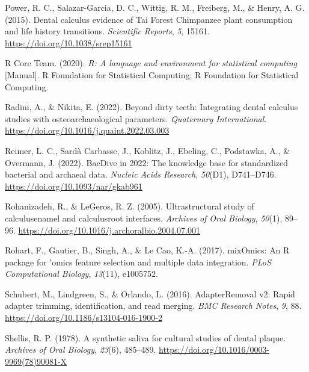 \documentclass[
  b5paper,
]{book}
\newlength{\cslhangindent}
\newlength{\cslentryspacingunit} %
\newenvironment{CSLReferences}[2] %
 {%
  \setlength{\parindent}{0pt}
  \ifodd #1
  \let\oldpar\par
  \def\par{\hangindent=\cslhangindent\oldpar}
  \fi
  \setlength{\parskip}{#2\cslentryspacingunit}
 }%
 {}
\begin{document}
\begin{CSLReferences}{1}{0}
\leavevmode{}%
Power, R. C., Salazar-Garcia, D. C., Wittig, R. M., Freiberg, M., \&
Henry, A. G. (2015). Dental calculus evidence of {Tai Forest Chimpanzee}
plant consumption and life history transitions. \emph{Scientific
Reports}, \emph{5}, 15161. \url{https://doi.org/10.1038/srep15161}

\leavevmode{}%
R Core Team. (2020). \emph{R: {A} language and environment for
statistical computing} {[}Manual{]}. {R Foundation for Statistical
Computing}; {R Foundation for Statistical Computing}.

\leavevmode{}%
Radini, A., \& Nikita, E. (2022). Beyond dirty teeth: {Integrating}
dental calculus studies with osteoarchaeological parameters.
\emph{Quaternary International}.
\url{https://doi.org/10.1016/j.quaint.2022.03.003}

\leavevmode{}%
Reimer, L. C., Sardà Carbasse, J., Koblitz, J., Ebeling, C., Podstawka,
A., \& Overmann, J. (2022). {BacDive} in 2022: The knowledge base for
standardized bacterial and archaeal data. \emph{Nucleic Acids Research},
\emph{50}(D1), D741--D746. \url{https://doi.org/10.1093/nar/gkab961}

\leavevmode{}%
Rohanizadeh, R., \& LeGeros, R. Z. (2005). Ultrastructural study of
calculus{\textendash}enamel and calculus{\textendash}root interfaces.
\emph{Archives of Oral Biology}, \emph{50}(1), 89--96.
\url{https://doi.org/10.1016/j.archoralbio.2004.07.001}

\leavevmode{}%
Rohart, F., Gautier, B., Singh, A., \& Le Cao, K.-A. (2017). {mixOmics}:
{An R} package for 'omics feature selection and multiple data
integration. \emph{PLoS Computational Biology}, \emph{13}(11), e1005752.

\leavevmode{}%
Schubert, M., Lindgreen, S., \& Orlando, L. (2016). {AdapterRemoval} v2:
Rapid adapter trimming, identification, and read merging. \emph{BMC
Research Notes}, \emph{9}, 88.
\url{https://doi.org/10.1186/s13104-016-1900-2}

\leavevmode{}%
Shellis, R. P. (1978). A synthetic saliva for cultural studies of dental
plaque. \emph{Archives of Oral Biology}, \emph{23}(6), 485--489.
\url{https://doi.org/10.1016/0003-9969(78)90081-X}


\end{CSLReferences}
\end{document}
